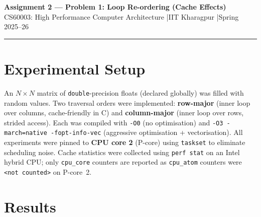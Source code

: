 \documentclass[10pt,a4paper]{article}
\begin{document}
\begin{center}
{\Large \textbf{Assignment 2 --- Problem 1: Loop Re-ordering (Cache Effects)}}\\[3pt]
{\normalsize CS60003: High Performance Computer Architecture \quad|\quad IIT Kharagpur \quad|\quad Spring 2025--26}
\end{center}

\vspace{2pt}
\hrule
\vspace{4pt}

\section{Experimental Setup}

An $N \times N$ matrix of \texttt{double}-precision floats (declared globally) was filled with
random values. Two traversal orders were implemented: \textbf{row-major} (inner loop over columns,
cache-friendly in C) and \textbf{column-major} (inner loop over rows, strided access). Each was
compiled with \texttt{-O0} (no optimisation) and \texttt{-O3 -march=native -fopt-info-vec}
(aggressive optimisation + vectorisation). All experiments were pinned to \textbf{CPU core 2}
(P-core) using \texttt{taskset} to eliminate scheduling noise. Cache statistics were collected
using \texttt{perf stat} on an Intel hybrid CPU; only \texttt{cpu\_core} counters are reported
as \texttt{cpu\_atom} counters were \texttt{<not counted>} on P-core~2.

\vspace{4pt}
\section{Results}
\end{document}
